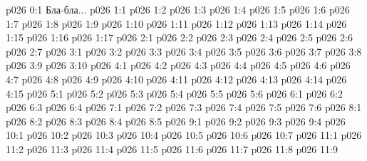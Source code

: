 \author{Совершенствователь Мудрости}
\vs p026 0:1  Бла-бла...
\vs p026 1:1 
\vs p026 1:2 \pc 
\vs p026 1:3 
\vs p026 1:4 
\vs p026 1:5 
\vs p026 1:6 
\vs p026 1:7 
\vs p026 1:8 
\vs p026 1:9 
\vs p026 1:10 \pc 
\vs p026 1:11 \pc 
\vs p026 1:12 
\vs p026 1:13 
\vs p026 1:14 
\vs p026 1:15 \pc 
\vs p026 1:16 
\vs p026 1:17 
\vs p026 2:1 
\vs p026 2:2 \pc 
\vs p026 2:3 \pc 
\vs p026 2:4 \pc 
\vs p026 2:5 \pc 
\vs p026 2:6 \pc 
\vs p026 2:7 \pc 
{}
\vs p026 3:1 
\vs p026 3:2 
\vs p026 3:3 \pc 
\vs p026 3:4 
\vs p026 3:5 
\vs p026 3:6 
\vs p026 3:7 
\vs p026 3:8 
\vs p026 3:9 
\vs p026 3:10 
\vs p026 4:1 
\vs p026 4:2 \pc 
\vs p026 4:3 
\vs p026 4:4 
\vs p026 4:5 
\vs p026 4:6 
\vs p026 4:7 
\vs p026 4:8 
\vs p026 4:9 
\vs p026 4:10 \pc 
\vs p026 4:11 
\vs p026 4:12 
\vs p026 4:13 
\vs p026 4:14 
\vs p026 4:15 
\vs p026 5:1 
\vs p026 5:2 
\vs p026 5:3 
\vs p026 5:4 
\vs p026 5:5 
\vs p026 5:6 
\vs p026 6:1 
\vs p026 6:2 
\vs p026 6:3 
\vs p026 6:4 
\vs p026 7:1 
\vs p026 7:2 
\vs p026 7:3 
\vs p026 7:4 
\vs p026 7:5 \pc 
\vs p026 7:6 
\vs p026 8:1 
\vs p026 8:2 
\vs p026 8:3 
\vs p026 8:4 \pc 
\vs p026 8:5 
\vs p026 9:1 
\vs p026 9:2 
\vs p026 9:3 \pc 
\vs p026 9:4 
\vs p026 10:1 
\vs p026 10:2 \pc 
\vs p026 10:3 
\vs p026 10:4 
\vs p026 10:5 
\vs p026 10:6 
\vs p026 10:7 
\vs p026 11:1 
\vs p026 11:2 \pc 
\vs p026 11:3 
\vs p026 11:4 
\vs p026 11:5 \pc 
\vs p026 11:6 \pc 
\vs p026 11:7 
\vs p026 11:8 
\vsetoff
\vs p026 11:9 
\quizlink
